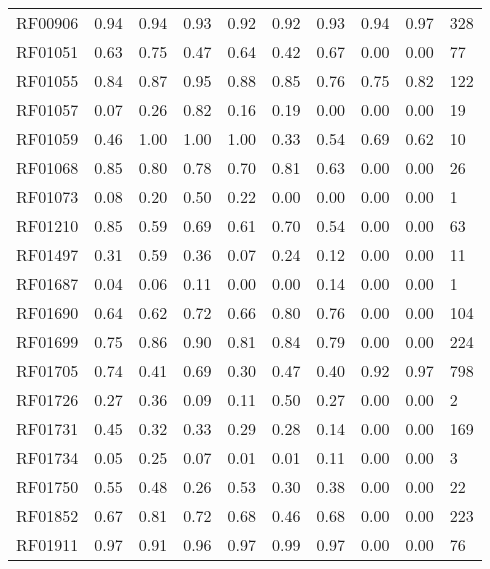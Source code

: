 \begin{tabular}{lrrrrrrrrl}
RF00906      &  0.94 &  0.94 &  0.93 &   0.92 &    0.92 &     0.93 &  0.94 & 0.97 &        328 \\
RF01051      &  0.63 &  0.75 &  0.47 &   0.64 &    0.42 &     0.67 &  0.00 & 0.00 &         77 \\
RF01055      &  0.84 &  0.87 &  0.95 &   0.88 &    0.85 &     0.76 &  0.75 & 0.82 &        122 \\
RF01057      &  0.07 &  0.26 &  0.82 &   0.16 &    0.19 &     0.00 &  0.00 & 0.00 &         19 \\
RF01059      &  0.46 &  1.00 &  1.00 &   1.00 &    0.33 &     0.54 &  0.69 & 0.62 &         10 \\
RF01068      &  0.85 &  0.80 &  0.78 &   0.70 &    0.81 &     0.63 &  0.00 & 0.00 &         26 \\
RF01073      &  0.08 &  0.20 &  0.50 &   0.22 &    0.00 &     0.00 &  0.00 & 0.00 &          1 \\
RF01210      &  0.85 &  0.59 &  0.69 &   0.61 &    0.70 &     0.54 &  0.00 & 0.00 &         63 \\
RF01497      &  0.31 &  0.59 &  0.36 &   0.07 &    0.24 &     0.12 &  0.00 & 0.00 &         11 \\
RF01687      &  0.04 &  0.06 &  0.11 &   0.00 &    0.00 &     0.14 &  0.00 & 0.00 &          1 \\
RF01690      &  0.64 &  0.62 &  0.72 &   0.66 &    0.80 &     0.76 &  0.00 & 0.00 &        104 \\
RF01699      &  0.75 &  0.86 &  0.90 &   0.81 &    0.84 &     0.79 &  0.00 & 0.00 &        224 \\
RF01705      &  0.74 &  0.41 &  0.69 &   0.30 &    0.47 &     0.40 &  0.92 & 0.97 &        798 \\
RF01726      &  0.27 &  0.36 &  0.09 &   0.11 &    0.50 &     0.27 &  0.00 & 0.00 &          2 \\
RF01731      &  0.45 &  0.32 &  0.33 &   0.29 &    0.28 &     0.14 &  0.00 & 0.00 &        169 \\
RF01734      &  0.05 &  0.25 &  0.07 &   0.01 &    0.01 &     0.11 &  0.00 & 0.00 &          3 \\
RF01750      &  0.55 &  0.48 &  0.26 &   0.53 &    0.30 &     0.38 &  0.00 & 0.00 &         22 \\
RF01852      &  0.67 &  0.81 &  0.72 &   0.68 &    0.46 &     0.68 &  0.00 & 0.00 &        223 \\
RF01911      &  0.97 &  0.91 &  0.96 &   0.97 &    0.99 &     0.97 &  0.00 & 0.00 &         76 \\

\end{tabular}
